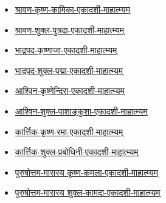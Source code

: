 {\begin{center}
\begin{itemize}
        \item \hyperref[sec:vrata-raja-shravana-krishna-kamika]{श्रावण-कृष्ण-कामिका-एकादशी-माहात्म्यम्}
        \item \hyperref[sec:vrata-raja-shravana-shukla-putrada]{श्रावण-शुक्ल-पुत्रदा-एकादशी-माहात्म्यम्}
        \item \hyperref[sec:vrata-raja-bhadrapada-krishnaja]{भाद्रपद-कृष्णाजा-एकादशी-माहात्म्यम्}
        \item \hyperref[sec:vrata-raja-bhadrapada-shukla-padma]{भाद्रपद-शुक्ल-पद्मा-एकादशी-माहात्म्यम्}
        \item \hyperref[sec:vrata-raja-ashvina-krishnendira]{आश्विन-कृष्णेन्दिरा-एकादशी-माहात्म्यम्}
        \item \hyperref[sec:vrata-raja-ashvina-shukla-pashankusha]{आश्विन-शुक्ल-पाशाङ्कुशा-एकादशी-माहात्म्यम्}
        \item \hyperref[sec:vrata-raja-karttika-krishna-rama]{कार्त्तिक-कृष्ण-रमा-एकादशी-माहात्म्यम्}
        \item \hyperref[sec:vrata-raja-karttika-shukla-prabodhini]{कार्त्तिक-शुक्ल-प्रबोधिनी-एकादशी-माहात्म्यम्}
        \item \hyperref[sec:vrata-raja-purushottama-krishna-kamala]{पुरुषोत्तम-मासस्य कृष्ण-कमला-एकादशी-माहात्म्यम्}
        \item \hyperref[sec:vrata-raja-purushottama-shukla-kamada]{पुरुषोत्तम-मासस्य शुक्ल-कामदा-एकादशी-माहात्म्यम्}
    \end{itemize}
    \clearpage
    
\end{center}
}{}
